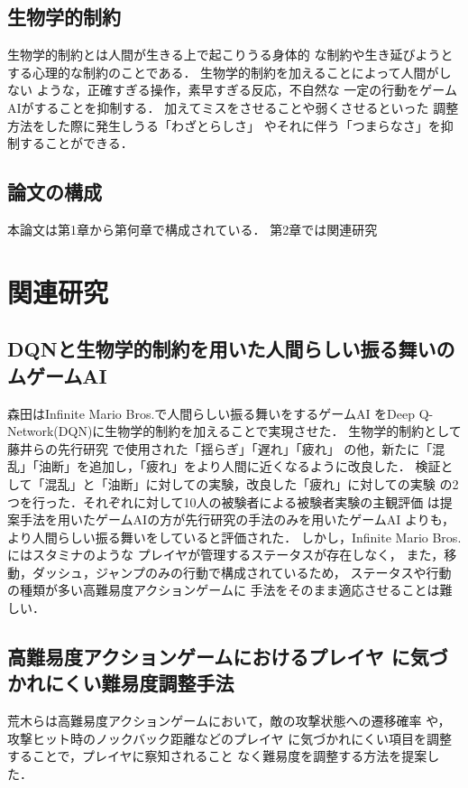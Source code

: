 \documentclass[a4paper,12pt,oneside,openany,titlepage]{jreport}
\begin{document}
\section{生物学的制約}
生物学的制約とは人間が生きる上で起こりうる身体的
な制約や生き延びようとする心理的な制約のことである．
生物学的制約を加えることによって人間がしない
ような，正確すぎる操作，素早すぎる反応，不自然な
一定の行動をゲームAIがすることを抑制する．
加えてミスをさせることや弱くさせるといった
調整方法をした際に発生しうる「わざとらしさ」
やそれに伴う「つまらなさ」を抑制することができる．

\section{論文の構成}
本論文は第1章から第何章で構成されている．
第2章では関連研究

\newpage

\chapter{関連研究}
 \thispagestyle{fancy}
 \lhead{\leftmark}
 \rhead{\thepage}
 \renewcommand{\headrulewidth}{1pt}

 \section{DQNと生物学的制約を用いた人間らしい振る舞いのムゲームAI}
 森田はInfinite Mario Bros.で人間らしい振る舞いをするゲームAI
 をDeep Q-Network(DQN)に生物学的制約を加えることで実現させた\cite{morita}．
 生物学的制約として藤井らの先行研究\cite{FuJi_en}
 で使用された「揺らぎ」「遅れ」「疲れ」
 の他，新たに「混乱」「油断」を追加し，「疲れ」をより人間に近くなるように改良した．
 検証として「混乱」と「油断」に対しての実験，改良した「疲れ」に対しての実験
 の2つを行った．それぞれに対して10人の被験者による被験者実験の主観評価
 は提案手法を用いたゲームAIの方が先行研究の手法のみを用いたゲームAI
 よりも，より人間らしい振る舞いをしていると評価された．
 しかし，Infinite Mario Bros.にはスタミナのような
 プレイヤが管理するステータスが存在しなく，
 また，移動，ダッシュ，ジャンプのみの行動で構成されているため，
 ステータスや行動の種類が多い高難易度アクションゲームに
 手法をそのまま適応させることは難しい．
 
 \newpage

 \section{高難易度アクションゲームにおけるプレイヤ
 に気づかれにくい難易度調整手法}\label{teigi}
 荒木らは高難易度アクションゲームにおいて，敵の攻撃状態への遷移確率
 や，攻撃ヒット時のノックバック距離などのプレイヤ
 に気づかれにくい項目を調整することで，プレイヤに察知されること
 なく難易度を調整する方法を提案した．\cite{dif-action}
 
\end{document}
